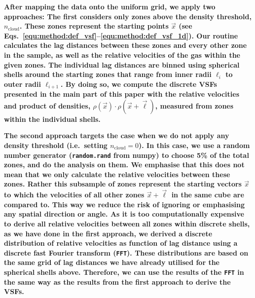 \textbf{
    After mapping the data onto the 
     uniform grid,  
we apply two approaches: 
    The first considers only zones above the density threshold, $n_\mathrm{cloud}$.
    These zones represent the starting points $\vec{x}$ (see Eqs.~\ref{equ:method:def_vsf}--\ref{equ:method:def_vsf_1d}).
    Our routine 
     calculates the lag distances between these zones and 
every other zone in the sample, as well as the relative velocities of the gas 
within the given zones. 
    The individual lag distances are 
   binned using
spherical shells around the starting zones that range from inner radii $\ell_{i}$ to outer radii $\ell_{i+1}$. 
    By doing so, we compute the discrete VSFs presented in the main part of this paper with the relative velocities and product of densities, $\rho(\vec{x}) \cdot \rho(\vec{x}+\vec{\ell})$, measured from zones within the individual shells.
}

\textbf{
    The second approach targets the case when we do not apply any density threshold (i.e.~setting $n_\mathrm{cloud} =0$).
    In this case, we use a random number generator (\texttt{random.rand} from numpy) to %
     choose 5\% of the total zones, and do the analysis on them.
     We emphasise that this does not mean that we only calculate the relative velocities 
     between these zones. Rather this subsample of zones represent the starting 
     vectors $\vec{x}$ to which the velocities of all other zones $\vec{x} + \vec{\ell}$ 
     in the same cube are compared to. This way we reduce the risk of ignoring or 
     emphasising any spatial direction or angle.
As it is too computationally expensive to derive all relative velocities between all zones within discrete shells, as we have done in the first approach, we derived a discrete distribution of relative velocities as function of lag distance using a discrete fast Fourier transform (\texttt{FFT}). 
    These distributions are based on the same grid of lag distances we have already utilised for the spherical shells above.
    Therefore, we can use the results of the \texttt{FFT} in the same way as the results from the first approach to derive the VSFs.
}

